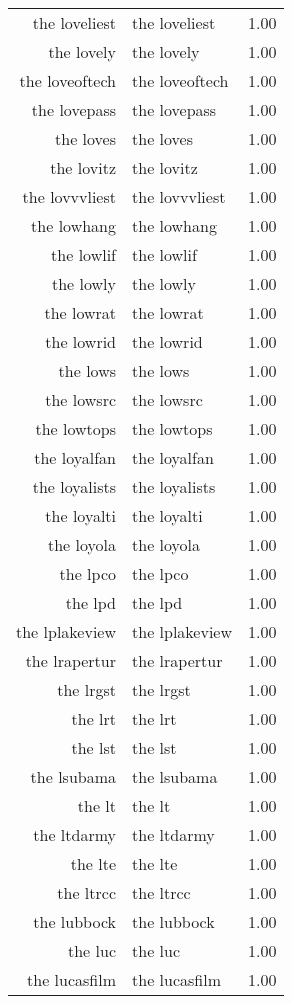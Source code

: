 \begin{table}[ht]
\begin{tabular}{rlr}
  the loveliest & the loveliest & 1.00 \\ 
  the lovely & the lovely & 1.00 \\ 
  the loveoftech & the loveoftech & 1.00 \\ 
  the lovepass & the lovepass & 1.00 \\ 
  the loves & the loves & 1.00 \\ 
  the lovitz & the lovitz & 1.00 \\ 
  the lovvvliest & the lovvvliest & 1.00 \\ 
  the lowhang & the lowhang & 1.00 \\ 
  the lowlif & the lowlif & 1.00 \\ 
  the lowly & the lowly & 1.00 \\ 
  the lowrat & the lowrat & 1.00 \\ 
  the lowrid & the lowrid & 1.00 \\ 
  the lows & the lows & 1.00 \\ 
  the lowsrc & the lowsrc & 1.00 \\ 
  the lowtops & the lowtops & 1.00 \\ 
  the loyalfan & the loyalfan & 1.00 \\ 
  the loyalists & the loyalists & 1.00 \\ 
  the loyalti & the loyalti & 1.00 \\ 
  the loyola & the loyola & 1.00 \\ 
  the lpco & the lpco & 1.00 \\ 
  the lpd & the lpd & 1.00 \\ 
  the lplakeview & the lplakeview & 1.00 \\ 
  the lrapertur & the lrapertur & 1.00 \\ 
  the lrgst & the lrgst & 1.00 \\ 
  the lrt & the lrt & 1.00 \\ 
  the lst & the lst & 1.00 \\ 
  the lsubama & the lsubama & 1.00 \\ 
  the lt & the lt & 1.00 \\ 
  the ltdarmy & the ltdarmy & 1.00 \\ 
  the lte & the lte & 1.00 \\ 
  the ltrcc & the ltrcc & 1.00 \\ 
  the lubbock & the lubbock & 1.00 \\ 
  the luc & the luc & 1.00 \\ 
  the lucasfilm & the lucasfilm & 1.00 \\ 

\end{tabular}
\end{table}
